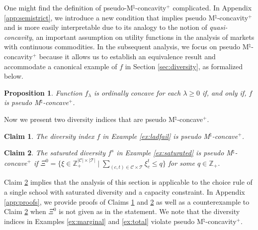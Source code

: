 \documentclass[12pt]{amsart}
\newtheorem{proposition}{Proposition}
\newtheorem{claim}{Claim}
\theoremstyle{remark}
\begin{document}
One might find the definition of pseudo-M$^\natural$-concavity$^+$ complicated. In
Appendix \ref{app:semistrict}, we introduce a new condition that implies
pseudo M$^\natural$-concavity$^+$ and is more easily interpretable due to its analogy to the notion of {\it quasi-concavity}, an important assumption on utility functions in the analysis of markets with continuous commodities. In the subsequent analysis, we focus on pseudo M$^\natural$-concavity$^+$ because it allows us to establish an equivalence result and accommodate a canonical example of $f$ in Section \ref{sec:diversity}, as formalized below.


\begin{proposition} \label{prop:ordinal-equivalence}
Function $f_\lambda$ is ordinally concave for each $\lambda\geq 0$ if, and only if, $f$ is pseudo M$^\natural$-concave$^+$.
\end{proposition}

Now we present two diversity indices that are pseudo  M$^\natural$-concave$^+$.

\begin{claim}\label{claim:ex1-pMC}
The diversity index $f$ in Example \ref{ex:ladfail} is pseudo M$^\natural$-concave$^+$.
\end{claim}

\begin{claim} \label{claim:ex2-pMC}
The saturated diversity $f^s$ in Example \ref{ex:saturated} is pseudo M$^\natural$-concave$^+$ if $\Xi^0=\{\xi\in \mathbb{Z}^{|\mathcal{C}|\times |\mathcal{T}|}_+ \mid \sum_{(c,t) \in \mathcal{C}\times \mathcal{T}} \xi_c^t \leq q\}$ for some $q\in \mathbb{Z}_+$.
\end{claim}
Claim \ref{claim:ex2-pMC} implies that the analysis of this section is applicable to the choice rule of a single school with saturated diversity and a capacity constraint.
In Appendix \ref{app:proofs}, we provide proofs of Claims \ref{claim:ex1-pMC} and \ref{claim:ex2-pMC} as well as a counterexample to Claim \ref{claim:ex2-pMC}
when $\Xi^0$ is not given as in the statement. We note that the diversity indices in Examples \ref{ex:marginal} and \ref{ex:total} violate pseudo M$^\natural$-concavity$^+$.
\end{document}
